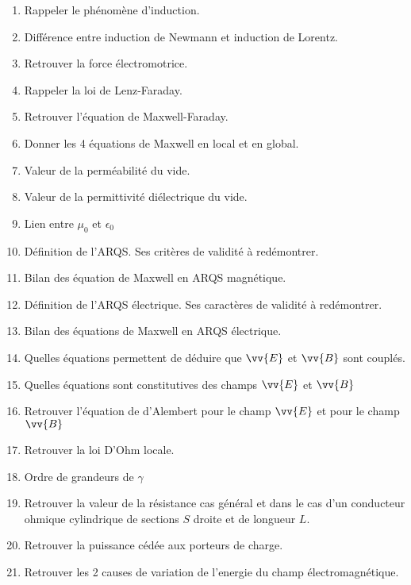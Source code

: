 \documentclass[a4paper, 11pt, hidelinks]{article}
\begin{document}
\begin{enumerate}
    \item Rappeler le phénomène d'induction. \cite{Chapitre13}
    \item Différence entre induction de Newmann et induction de Lorentz. \cite{Chapitre13}
    \item Retrouver la force électromotrice. \cite{Chapitre13}
    \item Rappeler la loi de Lenz-Faraday. \cite{Chapitre13}
    \item Retrouver l'équation de Maxwell-Faraday. \cite{Chapitre13}
    \item Donner les 4 équations de Maxwell en local et en global. \cite{Chapitre13}
    \item Valeur de la perméabilité du vide. \cite{Chapitre13}
    \item Valeur de la permittivité diélectrique du vide. \cite{Chapitre13}
    \item Lien entre $\mu_0$ et $\epsilon_0$ \cite{Chapitre13}
    \item Définition de l'ARQS. Ses critères de validité à redémontrer. \cite{Chapitre13}
    \item Bilan des équation de Maxwell en ARQS magnétique. \cite{Chapitre13}
    \item Définition de l'ARQS électrique. Ses caractères de validité à redémontrer. \cite{Chapitre13}
    \item Bilan des équations de Maxwell en ARQS électrique. \cite{Chapitre13}
    \item Quelles équations permettent de déduire que $\vv{E}$ et $\vv{B}$ sont couplés. \cite{Chapitre13}
    \item Quelles équations sont constitutives des champs $\vv{E}$ et $\vv{B}$ \cite{Chapitre13}
    \item Retrouver l'équation de d'Alembert pour le champ $\vv{E}$ et pour le champ $\vv{B}$ \cite{Chapitre13}
    \item Retrouver la loi D'Ohm locale. \cite{Chapitre14}
    \item Ordre de grandeurs de $\gamma$ \cite{Chapitre14}
    \item Retrouver la valeur de la résistance cas général et dans le cas d'un conducteur ohmique cylindrique de sections $S$ droite et de longueur $L$. \cite{Chapitre14}
    \item Retrouver la puissance cédée aux porteurs de charge. \cite{Chapitre14}
    \item Retrouver les 2 causes de variation de l'energie du champ électromagnétique. \cite{Chapitre14}

\end{enumerate}
\end{document}
